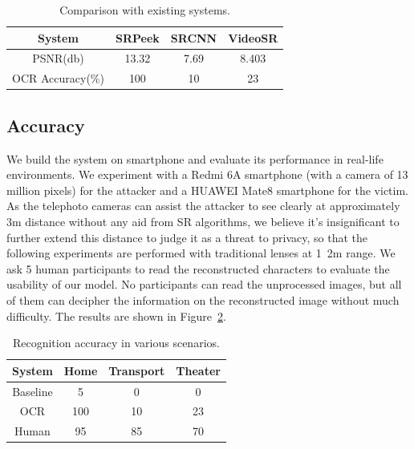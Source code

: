 
\begin{table}[!t]
    \centering
    \begin{tabular}{@{}cccc@{}}
        \toprule
    System & SRPeek & SRCNN & VideoSR \\ \midrule
    PSNR(db) & 13.32 & 7.69 & 8.403\\ 
    OCR Accuracy(\%) & 100 & 10 & 23\\ \bottomrule
    \end{tabular}
    \caption{Comparison with existing systems.}
    \label{table-comp}
\end{table}

\subsection{Accuracy}
We build the system on smartphone and evaluate its performance in real-life environments. We experiment with a Redmi 6A smartphone (with a camera of 13 million pixels) for the attacker and a HUAWEI Mate8 smartphone for the victim. As the telephoto cameras can assist the attacker to see clearly at approximately 3m distance without any aid from SR algorithms, we believe it's insignificant to further extend this distance to judge it as a threat to privacy, so that the following experiments are performed with traditional lenses at 1~2m range. We ask 5 human participants to read the reconstructed characters to evaluate the usability of our model. No participants can read the unprocessed images, but all of them can decipher the information on the reconstructed image without much difficulty. The results are shown in Figure~\ref{table-scenarios}.

\begin{table}[!t]
    \centering
    \begin{tabular}{@{}cccc@{}}
        \toprule
    System & Home & Transport & Theater \\ \midrule
    Baseline & 5 & 0 & 0\\ 
    \midrule
    OCR & 100 & 10 & 23\\ 
    Human & 95 & 85 & 70\\ \bottomrule
    \end{tabular}
    \caption{Recognition accuracy in various scenarios.}
    \label{table-scenarios}
\end{table}


